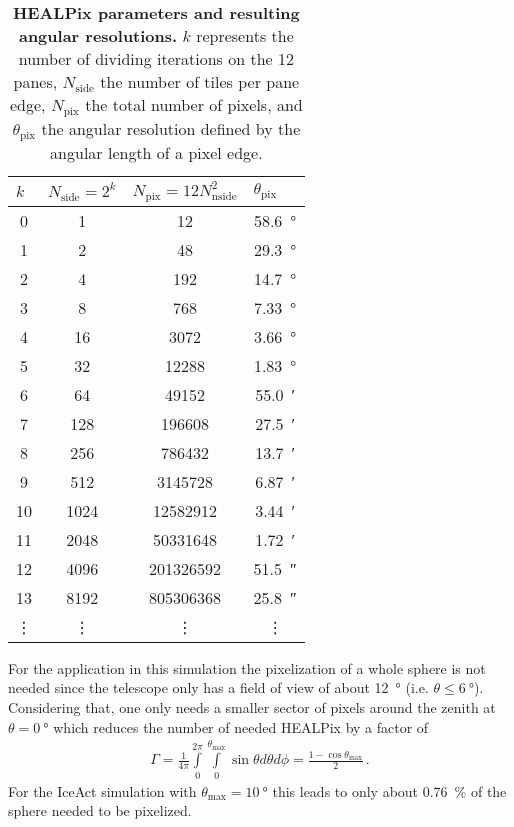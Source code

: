 \begin{table}[h]
\centering
\begin{tabular}{S[table-format=2.0]|S[table-format=4.0]|S[table-format=9.0]|S[table-format=2.2]}
 &  &  &  \\
  & 1    & 12        &  \SI{58.6}{\degree}\\
1  & 2    & 48        &  \SI{29.3}{\degree}\\
2  & 4    & 192       &  \SI{14.7}{\degree}\\
3  & 8    & 768 	  &  \SI{7.33}{\degree}\\
4  & 16   & 3072      &  \SI{3.66}{\degree}\\
5  & 32   & 12288     &  \SI{1.83}{\degree}\\
6  & 64   & 49152     &  \SI{55.0}{\arcminute}\\
7  & 128  & 196608    &  \SI{27.5}{\arcminute}\\
8  & 256  & 786432    &  \SI{13.7}{\arcminute}\\
9  & 512  & 3145728   &  \SI{6.87}{\arcminute}\\
10 & 1024 & 12582912  &  \SI{3.44}{\arcminute}\\
11 & 2048 & 50331648  &  \SI{1.72}{\arcminute}\\
12 & 4096 & 201326592 &  \SI{51.5}{\arcsecond}\\
13 & 8192 & 805306368 &  \SI{25.8}{\arcsecond}\\
 &  &  &  \\
\end{tabular}
\caption[HEALPix parameters and resulting angular resolutions]{\textbf{HEALPix parameters and resulting angular resolutions.} $k$ represents the number of dividing iterations on the 12 panes, $N_\text{side}$ the number of tiles per pane edge, $N_\text{pix}$ the total number of pixels, and $\theta_\text{pix}$ the angular resolution defined by the angular length of a pixel edge. \cite{healpix:paper}}
\end{table}

For the application in this simulation the pixelization of a whole sphere is not needed since the telescope only has a field of view of about \SI{12}{\degree} (i.e. $\theta \leq \SI{6}{\degree}$). Considering that, one only needs a smaller sector of pixels around the zenith at $\theta = \SI{0}{\degree}$ which reduces the number of needed HEALPix by a factor of
\begin{align}
	\Gamma = \frac{1}{4\pi}\int\limits_{0}^{2\pi}\int\limits_{0}^{\theta_\text{max}}\sin{\theta} d\theta d\phi = \frac{1-\cos\theta_\text{max}}{2}\,.
	\label{eq:spherefactor}
\end{align}
For the IceAct simulation with $\theta_\text{max} = \SI{10}{\degree}$ this leads to only about \SI{0.76}{\percent} of the sphere needed to be pixelized.

